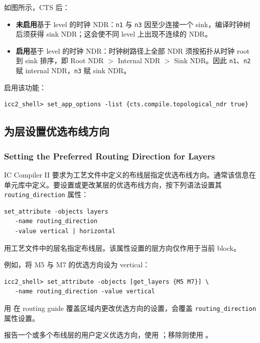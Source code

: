 如图所示，CTS 后：
\begin{itemize}
  \item \textbf{未启用}基于 level 的时钟 NDR：\texttt{n1} 与 \texttt{n3} 因至少连接一个 sink，编译时钟树后须获得 sink NDR；这会使不同 level 上出现不连续的 NDR。
  \item \textbf{启用}基于 level 的时钟 NDR：时钟树路径上全部 NDR 须按拓扑从时钟 root 到 sink 排序，即 Root NDR $>$ Internal NDR $>$ Sink NDR。因此 \texttt{n1}、\texttt{n2} 赋 internal NDR，\texttt{n3} 赋 sink NDR。
\end{itemize}

启用该功能：
\begin{lstlisting}
icc2_shell> set_app_options -list {cts.compile.topological_ndr true}
\end{lstlisting}

\subsection{为层设置优选布线方向}
\subsubsection*{Setting the Preferred Routing Direction for Layers}

IC Compiler II 要求为工艺文件中定义的布线层指定优选布线方向。通常该信息在单元库中定义。要设置或更改某层的优选布线方向，按下列语法设置其 \texttt{routing\_direction} 属性：
\begin{lstlisting}
set_attribute -objects layers
   -name routing_direction
   -value vertical | horizontal
\end{lstlisting}

用工艺文件中的层名指定布线层。该属性设置的层方向仅作用于当前 block。

例如，将 M5 与 M7 的优选方向设为 vertical：
\begin{lstlisting}
icc2_shell> set_attribute -objects [get_layers {M5 M7}] \
   -name routing_direction -value vertical
\end{lstlisting}

\begin{noteBox}
用  在 routing guide 覆盖区域内更改优选方向的设置，会覆盖 \texttt{routing\_direction} 属性设置。
\end{noteBox}

报告一个或多个布线层的用户定义优选方向，使用 ；移除则使用 。

